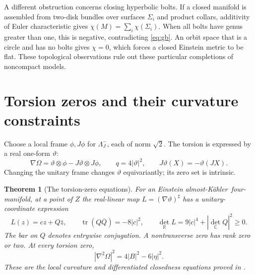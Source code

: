 \documentclass[11pt,a4paper]{article}
\newtheorem{inputtheorem}[theorem]{Theorem}
\theoremstyle{definition}
\theoremstyle{remark}
\newcommand{\tr}{\operatorname{tr}}
\newcommand{\R}{\mathbb R}
\newcommand{\C}{\mathbb C}
\newcommand{\AK}{almost-K\"ahler}
\begin{document}
A different obstruction concerns closing hyperbolic bolts. If a closed manifold is assembled from two-disk bundles over surfaces $\Sigma_i$ and product collars, additivity of Euler characteristic gives $\chi(M)=\sum_i\chi(\Sigma_i)$. When all bolts have genus greater than one, this is negative, contradicting \eqref{eq:gb}. An orbit space that is a circle and has no bolts gives $\chi=0$, which forces a closed Einstein metric to be flat. These topological observations rule out these particular completions of noncompact models.

\section{Torsion zeros and their curvature constraints}
Choose a local frame $\phi,J\phi$ for $\Lambda_J^-$, each of norm $\sqrt2$. The torsion is expressed by a real one-form $\vartheta$:
\begin{equation}\label{eq:torsion}
 \nabla\Omega=\vartheta\otimes\phi-J\vartheta\otimes J\phi,
 \qquad q=4|\vartheta|^2,
 \qquad J\vartheta(X)=-\vartheta(JX).
\end{equation}
Changing the unitary frame changes $\vartheta$ equivariantly; its zero set is intrinsic.

\begin{inputtheorem}[The torsion-zero equations]\label{input:zeros}
For an Einstein \AK\ four-manifold, at a point of $Z$ the real-linear map $L=(\nabla\vartheta)^\sharp$ has a unitary-coordinate expression
\begin{equation}\label{eq:zeroL}
 L(z)=cz+Q\bar z,\qquad
 \tr(Q\bar Q)=-8|c|^2,\qquad
 \det_{\R}L=9|c|^4+|\det_{\C}Q|^2\ge0.
\end{equation}
The bar on $Q$ denotes entrywise conjugation. A nontransverse zero has rank zero or two. At every torsion zero,
\begin{equation}\label{eq:zerohessian}
 |\nabla^2\Omega|^2=4|B|^2-6|\eta|^2.
\end{equation}
These are the local curvature and differentiated closedness equations proved in \cite{ZeroSource}.
\end{inputtheorem}
\end{document}
